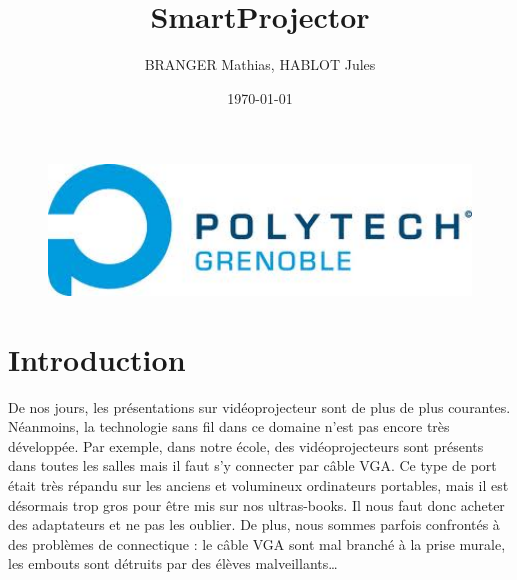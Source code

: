\documentclass[a4paper, 11pt]{article}
\title{\Huge{SmartProjector}}
\author{BRANGER Mathias, HABLOT Jules}
\date{\today}
\begin{document}
\maketitle

\begin{figure}
	\centering
	\includegraphics[width=1\textwidth]{polytech.jpg}
\end{figure}

\clearpage

\tableofcontents

\clearpage



\section{Introduction}

De nos jours, les présentations sur vidéoprojecteur sont de plus de plus courantes. Néanmoins, la technologie sans fil dans ce domaine n'est pas encore très développée. Par exemple, dans notre école, des vidéoprojecteurs sont présents dans toutes les salles mais il faut s'y connecter par câble VGA. Ce type de port était très répandu sur les anciens et volumineux ordinateurs portables, mais il est désormais trop gros pour être mis sur nos ultras-books. Il nous faut donc acheter des adaptateurs et ne pas les oublier. De plus, nous sommes parfois confrontés à des problèmes de connectique : le câble VGA sont mal branché à la prise murale, les embouts sont détruits par des élèves malveillants…
\end{document}

